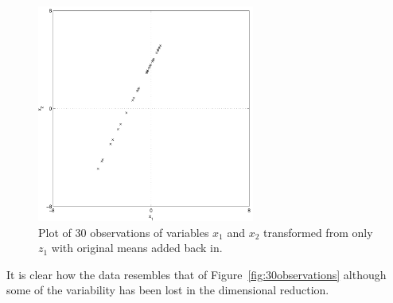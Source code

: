 \begin{figure}[!]
  \begin{center}
    \includegraphics[width=270px]{30observationsFinal.pdf}
    \caption{Plot of 30 observations of variables $x_1$ and $x_2$ transformed from only $z_1$ with original means added back in.}\label{fig:30observationsFinal}
  \end{center}
\end{figure}

It is clear how the data resembles that of Figure~\ref{fig:30observations} although some of the variability has been lost in the dimensional reduction.

